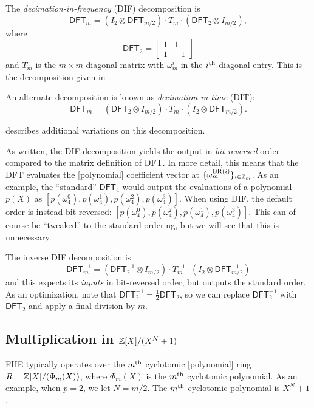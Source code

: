 \documentclass[../fheimpl.tex]{subfiles}
\begin{document}
The \emph{decimation-in-frequency} (DIF) decomposition is
\[\mathsf{DFT}_m = (I_2\otimes \mathsf{DFT}_{m/2})\cdot T_m\cdot (\mathsf{DFT}_2\otimes I_{m/2}),\]
where
\[\mathsf{DFT}_2=
\begin{bmatrix}
	1 & 1 \\
	1 & -1
\end{bmatrix}
\]
and
$T_m$ is the $m\times m$ diagonal matrix with $\omega_m^i$ in the $i^{\mathrm{th}}$ diagonal entry. This is the decomposition given in~\cite{cryptoeprint:2013/293}.

An alternate decomposition is known as \emph{decimation-in-time} (DIT):
\[\mathsf{DFT}_m = (\mathsf{DFT}_2\otimes I_{m/2})\cdot T_m\cdot (I_2\otimes \mathsf{DFT}_{m/2}).\]

\cite[C.2.5]{cryptoeprint:2015/1134} describes additional variations on this decomposition. 

As written, the DIF decomposition yields the output in \emph{bit-reversed} order compared to the matrix definition of DFT. In more detail, this means that the DFT evaluates the [polynomial] coefficient vector at  $\{\omega_m^{\mathrm{BR}(i)}\}_{i\in\mathbb{Z}_m}$. As an example, the ``standard'' $\mathsf{DFT}_4$ would output the evaluations of a polynomial $p(X)$ as $[p(\omega_4^0), p(\omega_4^1), p(\omega_4^2), p(\omega_4^3)]$. When using DIF, the default order is instead bit-reversed: $[p(\omega_4^0), p(\omega_4^2), p(\omega_4^1), p(\omega_4^3)]$. This can of course be ``tweaked'' to the standard ordering, but we will see that this is unnecessary.

The inverse DIF decomposition is
\[\mathsf{DFT}_m^{-1} = (\mathsf{DFT}_2^{-1}\otimes I_{m/2})\cdot T_m^{-1}\cdot(I_2\otimes \mathsf{DFT}_{m/2}^{-1})\]
and this expects its \emph{inputs} in bit-reversed order, but outputs the standard order.
As an optimization, note that $\mathsf{DFT}_2^{-1}=\frac{1}{2}\mathsf{DFT}_2$, so we can replace $\mathsf{DFT}_2^{-1}$ with $\mathsf{DFT}_2$ and apply a final division by $m$.

\subsection{Multiplication in $\mathbb{Z}[X]/(X^N+1)$}
FHE typically operates over the $m^{\mathrm{th}}$ cyclotomic [polynomial] ring $R=\mathbb{Z}[X]/(\Phi_m(X))$, where $\Phi_m(X)$ is the $m^{\mathrm{th}}$ cyclotomic polynomial. As an example, when $p=2$, we let $N=m/2$. The $m^{\mathrm{th}}$ cyclotomic polynomial is $X^N+1$. 
\end{document}
